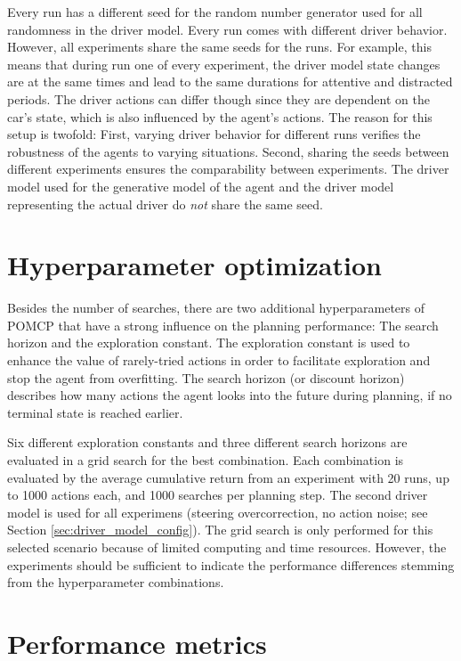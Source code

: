 Every run has a different seed for the random number generator used for all randomness in the driver model. Every run comes with different driver behavior. However, all experiments share the same seeds for the runs. For example, this means that during run one of every experiment, the driver model state changes are at the same times and lead to the same durations for attentive and distracted periods. The driver actions can differ though since they are dependent on the car's state, which is also influenced by the agent's actions. The reason for this setup is twofold: First, varying driver behavior for different runs verifies the robustness of the agents to varying situations. Second, sharing the seeds between different experiments ensures the comparability between experiments. The driver model used for the generative model of the agent and the driver model representing the actual driver do \emph{not} share the same seed.

\section{Hyperparameter optimization}

Besides the number of searches, there are two additional hyperparameters of POMCP that have a strong influence on the planning performance: The search horizon and the exploration constant. The exploration constant is used to enhance the value of rarely-tried actions in order to facilitate exploration and stop the agent from overfitting. The search horizon (or discount horizon) describes how many actions the agent looks into the future during planning, if no terminal state is reached earlier.

Six different exploration constants and three different search horizons are evaluated in a grid search for the best combination. Each combination is evaluated by the average cumulative return from an experiment with 20 runs, up to 1000 actions each, and 1000 searches per planning step. The second driver model is used for all experimens (steering overcorrection, no action noise; see Section \ref{sec:driver_model_config}). The grid search is only performed for this selected scenario because of limited computing and time resources. However, the experiments should be sufficient to indicate the performance differences stemming from the hyperparameter combinations.

\section{Performance metrics}

